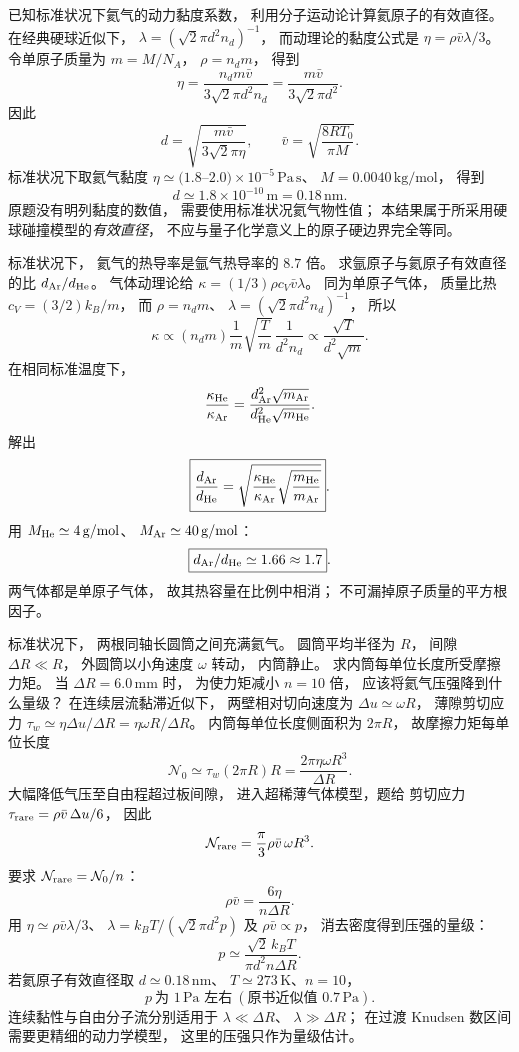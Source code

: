 已知标准状况下氦气的动力黏度系数，
利用分子运动论计算氦原子的有效直径。
\exsolution
在经典硬球近似下，
$\lambda=(\sqrt2\pi d^2n_d)^{-1}$，
而动理论的黏度公式是
$\eta=\rho\bar v\lambda/3$。
令单原子质量为
$m=M/N_A$，
$\rho=n_dm$，
得到
\[
\eta=\frac{n_dm\bar v}
{3\sqrt2\pi d^2 n_d}
=\frac{m\bar v}{3\sqrt2\pi d^2}.
\]
因此
\[
\boxed{d=\sqrt{
\frac{m\bar v}{3\sqrt2\pi\eta}
}},\qquad
\bar v=\sqrt{\frac{8RT_0}{\pi M}}.
\]
标准状况下取氦气黏度
$\eta\simeq(1.8$--$2.0)\times10^{-5}\,
\mathrm{Pa\,s}$、
$M=0.0040\,\mathrm{kg/mol}$，
得到
\[
\boxed{d\simeq1.8\times10^{-10}\,\mathrm m
=0.18\,\mathrm{nm}}.
\]
\excheck 原题没有明列黏度的数值，
需要使用标准状况氦气物性值；
本结果属于所采用硬球碰撞模型的\emph{有效直径}，
不应与量子化学意义上的原子硬边界完全等同。

标准状况下，
氦气的热导率是氩气热导率的
$8.7$ 倍。
求氩原子与氦原子有效直径的比
$d_{\rm Ar}/d_{\rm He}$。
\exsolution
气体动理论给
$\kappa=(1/3)\rho c_V\bar v\lambda$。
同为单原子气体，
质量比热
$c_V=(3/2)k_B/m$，
而
$\rho=n_dm$、
$\lambda=(\sqrt2\pi d^2n_d)^{-1}$，
所以
\[
\kappa\propto
(n_dm)\frac1m
\sqrt{\frac{T}{m}}\,
\frac1{d^2n_d}
\propto\frac{\sqrt T}{d^2\sqrt m}.
\]
在相同标准温度下，
\[
\frac{\kappa_{\rm He}}{\kappa_{\rm Ar}}
=\frac{d_{\rm Ar}^2\sqrt{m_{\rm Ar}}}
{d_{\rm He}^2\sqrt{m_{\rm He}}}.
\]
解出
\[
\boxed{\frac{d_{\rm Ar}}{d_{\rm He}}
=\sqrt{
\frac{\kappa_{\rm He}}{\kappa_{\rm Ar}}
\sqrt{\frac{m_{\rm He}}{m_{\rm Ar}}}}}.
\]
用 $M_{\rm He}\simeq4\,\mathrm{g/mol}$、
$M_{\rm Ar}\simeq40\,\mathrm{g/mol}$：
\[
\boxed{d_{\rm Ar}/d_{\rm He}\simeq1.66
\approx1.7}.
\]
\excheck 两气体都是单原子气体，
故其热容量在比例中相消；
不可漏掉原子质量的平方根因子。

标准状况下，
两根同轴长圆筒之间充满氦气。
圆筒平均半径为 $R$，
间隙 $\Delta R\ll R$，
外圆筒以小角速度 $\omega$ 转动，
内筒静止。
求内筒每单位长度所受摩擦力矩。
当 $\Delta R=6.0\,\mathrm{mm}$ 时，
为使力矩减小 $n=10$ 倍，
应该将氦气压强降到什么量级？
\exsolution
在连续层流黏滞近似下，
两壁相对切向速度为
$\Delta u\simeq\omega R$，
薄隙剪切应力
$\tau_w\simeq\eta\Delta u/\Delta R
=\eta\omega R/\Delta R$。
内筒每单位长度侧面积为 $2\pi R$，
故摩擦力矩每单位长度
\[
\boxed{\mathcal N_0\simeq
\tau_w(2\pi R)R
=\frac{2\pi\eta\omega R^3}{\Delta R}}.
\]
大幅降低气压至自由程超过板间隙，
进入超稀薄气体模型，题给
剪切应力
$\tau_{\rm rare}=\rho\bar v\,\Delta u/6$，
因此
\[
\mathcal N_{\rm rare}
=\frac{\pi}{3}\rho\bar v\,\omega R^3.
\]
要求
$\mathcal N_{\rm rare}=\mathcal N_0/n$：
\[
\rho\bar v=\frac{6\eta}{n\Delta R}.
\]
用
$\eta\simeq\rho\bar v\lambda/3$、
$\lambda=k_BT/(\sqrt2\pi d^2p)$
及 $\rho\bar v\propto p$，
消去密度得到压强的量级：
\[
\boxed{p\simeq\frac{\sqrt2\,k_BT}
{\pi d^2n\Delta R}}.
\]
若氦原子有效直径取
$d\simeq0.18\,\mathrm{nm}$、
$T\simeq273\,\mathrm K$、$n=10$，
\[
\boxed{p\ \text{为 }1\,\mathrm{Pa}\text{ 左右}
\ (\text{原书近似值 }0.7\,\mathrm{Pa})}.
\]
\excheck 连续黏性与自由分子流分别适用于
$\lambda\ll\Delta R$、
$\lambda\gg\Delta R$；
在过渡 Knudsen 数区间需要更精细的动力学模型，
这里的压强只作为量级估计。

